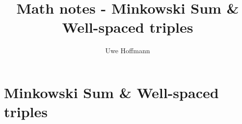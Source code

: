 

\title{Math notes - Minkowski Sum \& Well-spaced triples}
\author{Uwe Hoffmann}




\setcounter{chapter}{1}
\chapter*{Minkowski Sum \& Well-spaced triples}
